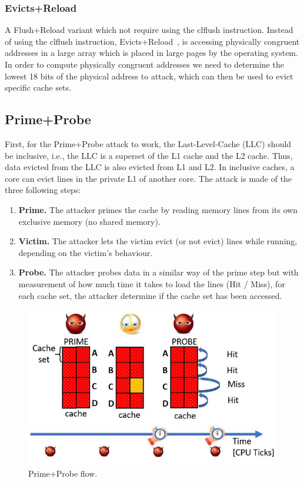 \subsubsection{Evicts+Reload}
\label{subsubsec:evictreload}
A Flush+Reload variant which not require using the clflush instruction.
Instead of using the clflush instruction, Evicts+Reload~\cite{Gruss2015}, is accessing physically congruent addresses in
a large array which is placed in large pages by the operating system. In order to compute physically congruent addresses we need to determine the lowest 18 bits of the physical address to attack, which can then be used to evict specific cache sets.

\subsection{Prime+Probe}
\label{subsec:primeprobe}
First, for the Prime+Probe attack to work, the Last-Level-Cache (LLC) should be
inclusive, i.e., the LLC is a superset of the L1 cache and the L2 cache. Thus,
data evicted from the LLC is also evicted from L1 and L2. In inclusive caches, a
core can evict lines in the private L1 of another core. The attack is made of
the three following steps:
\begin{enumerate}
    \item \textbf{Prime.} The attacker primes the cache by reading memory lines
    from its own exclusive memory (no shared memory).
    \item \textbf{Victim.} The attacker lets the victim evict (or not evict)
    lines while running, depending on the victim's behaviour.
    \item \textbf{Probe.} The attacker probes data in a similar way of the prime
    step but with measurement of how much time it takes to load the lines (Hit /
    Miss), for each cache set, the attacker determine if the cache set has been
    accessed.
\end{enumerate}

\begin{figure}[!ht]
    \centering
    \includegraphics[width=\textwidth]{images/chapter_6/pp_flow.JPG}
    \caption{Prime+Probe flow.}
    \label{fig:pp_flow}
\end{figure}

